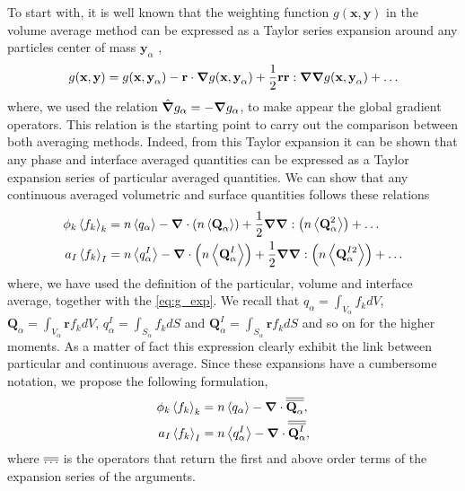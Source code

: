 To start with, it is well known that the weighting function $g(\textbf{x},\textbf{y})$ in the volume average method can be expressed as a Taylor series expansion around any particles center of mass $\textbf{y}_\alpha$ \citep{jackson1997locally},
\begin{equation}
    g(\textbf{x},\textbf{y})
    = g(\textbf{x},\textbf{y}_\alpha)
    - \textbf{r} \cdot \bm{\nabla} g(\textbf{x},\textbf{y}_\alpha)
    + \frac{1}{2} \textbf{r}\textbf{r} : \bm{\nabla}\bm{\nabla} g(\textbf{x},\textbf{y}_\alpha)
    + \ldots
    \label{eq:g_exp}
\end{equation} 
where, we used the relation $\hat{\bm{\nabla}} g_\alpha = - \bm{\nabla} g_\alpha$, to make appear the global gradient operators. 
This relation is the starting point to carry out the comparison between both averaging methods. 
Indeed, from this Taylor expansion it can be shown that any phase and interface averaged quantities can be expressed as a Taylor expansion series of particular averaged quantities. 
We can show that any continuous averaged volumetric and surface quantities follows these relations
\begin{align*}
    \phi_k \left<f_k\right>_k 
    &=  n \left<q_\alpha\right>
        - \bm{\nabla} \cdot  
        \left(n \left<\textbf{Q}_\alpha\right>\right)        
        + \frac{1}{2} \bm{\nabla}\bm{\nabla} : \left(n \left<\textbf{Q}_\alpha^2\right>\right)
        + \ldots  \\
    a_I \left<f_k\right>_I 
    &=  n \left<q_\alpha^I\right>        
        - \bm{\nabla} \cdot  \left(n \left<\textbf{Q}_\alpha^I\right>\right)        
        + \frac{1}{2} \bm{\nabla}\bm{\nabla} : \left(n \left<\textbf{Q}_\alpha^{I2}\right>\right)
        + \ldots  
\end{align*}      
where, we have used the definition of the particular, volume and interface average, together with the \ref{eq:g_exp}. 
We recall that $q_\alpha = \int_{V_\alpha} f_k dV$, $\textbf{Q}_\alpha = \int_{V_\alpha} \textbf{r} f_k dV$, $q_\alpha^I = \int_{S_\alpha} f_k dS$  and $\textbf{Q}_\alpha^I = \int_{S_\alpha} \textbf{r} f_k dS$ and so on for the higher moments. 
As a matter of fact this expression clearly exhibit the link between particular and continuous average.
Since these expansions have a cumbersome notation, we propose the following formulation, 
\begin{align}
    \phi_k \left<f_k\right>_k 
    &= n \left<q_\alpha\right> - \bm{\nabla} \cdot \overline{\overline{\textbf{Q}_\alpha}},\\
    a_I \left<f_k\right>_I 
    &= n \left<q_\alpha^I\right> - \bm{\nabla} \cdot \overline{\overline{\textbf{Q}^I_\alpha}}, 
    \label{eq:q_alpha_exp}
\end{align}   
where $\overline{\overline{\ldots}}$ is the operators that return the first and above order terms of the expansion series of the arguments.


